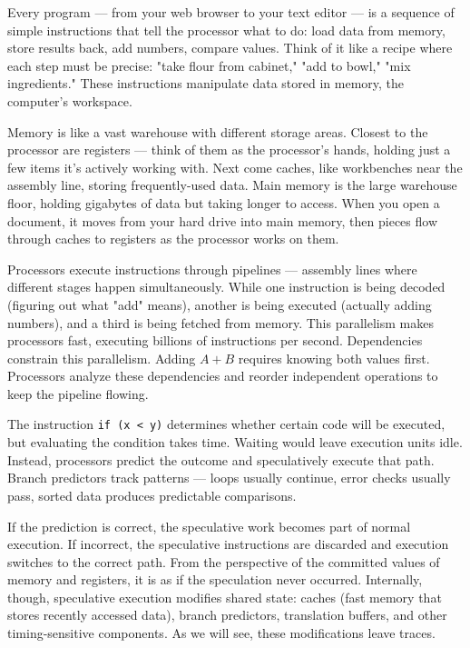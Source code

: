 Every program — from your web browser to your text editor — is a sequence of simple instructions that tell the processor what to do: load data from memory, store results back, add numbers, compare values. Think of it like a recipe where each step must be precise: "take flour from cabinet," "add to bowl," "mix ingredients." These instructions manipulate data stored in memory, the computer's workspace.

Memory is like a vast warehouse with different storage areas. Closest to the processor are registers — think of them as the processor's hands, holding just a few items it's actively working with. Next come caches, like workbenches near the assembly line, storing frequently-used data. Main memory is the large warehouse floor, holding gigabytes of data but taking longer to access. When you open a document, it moves from your hard drive into main memory, then pieces flow through caches to registers as the processor works on them.

Processors execute instructions through pipelines — assembly lines where different stages happen simultaneously. While one instruction is being decoded (figuring out what "add" means), another is being executed (actually adding numbers), and a third is being fetched from memory. This parallelism makes processors fast, executing billions of instructions per second. Dependencies constrain this parallelism. Adding $A+B$ requires knowing both values first. Processors analyze these dependencies and reorder independent operations to keep the pipeline flowing. 

The instruction \texttt{if (x < y)} determines whether certain code will be executed, but evaluating the condition takes time. Waiting would leave execution units idle. Instead, processors predict the outcome and speculatively execute that path. Branch predictors track patterns — loops usually continue, error checks usually pass, sorted data produces predictable comparisons.

If the prediction is correct, the speculative work becomes part of normal execution. If incorrect, the speculative instructions are discarded and execution switches to the correct path. From the perspective of the committed values of memory and registers, it is as if the speculation never occurred. Internally, though, speculative execution modifies shared state: caches (fast memory that stores recently accessed data), branch predictors, translation buffers, and other timing-sensitive components. As we will see, these modifications leave traces.

